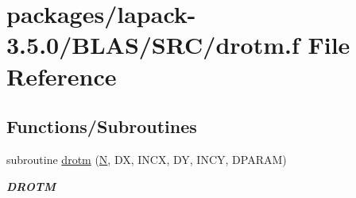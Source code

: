 \hypertarget{lapack-3_85_80_2BLAS_2SRC_2drotm_8f}{}\section{packages/lapack-\/3.5.0/\+B\+L\+A\+S/\+S\+R\+C/drotm.f File Reference}
\label{lapack-3_85_80_2BLAS_2SRC_2drotm_8f}
\subsection*{Functions/\+Subroutines}
\begin{DoxyCompactItemize}
\item 
subroutine \hyperlink{group__double__blas__level1_ga0d579faa55a493933032c5dcddbe5f4f}{drotm} (\hyperlink{polmisc_8c_a0240ac851181b84ac374872dc5434ee4}{N}, D\+X, I\+N\+C\+X, D\+Y, I\+N\+C\+Y, D\+P\+A\+R\+A\+M)
\begin{DoxyCompactList}\small\item\em {\bfseries D\+R\+O\+T\+M} \end{DoxyCompactList}\end{DoxyCompactItemize}
